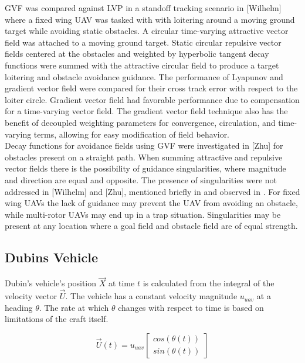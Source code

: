 \documentclass[conf]{new-aiaa}
\begin{document}
GVF was compared against LVP in a standoff tracking scenario in [Wilhelm] where a fixed wing UAV was tasked with with loitering around a moving ground target while avoiding static obstacles.  A circular time-varying attractive vector field was attached to a moving ground target. Static circular repulsive vector fields centered at the obstacles and weighted by hyperbolic tangent decay functions were summed with the attractive circular field to produce a target loitering and obstacle avoidance guidance. The performance of Lyapunov \cite{frew_cooperative_2007} and gradient vector field \cite{goncalves_artificial_2009,goncalves_circulation_2010,goncalves_vector_2010} were compared for their cross track error with respect to the loiter circle. Gradient vector field had favorable performance due to compensation for a time-varying vector field. The gradient vector field technique also has the benefit of decoupled weighting parameters for convergence, circulation, and time-varying terms, allowing for easy modification of field behavior. \\

Decay functions for avoidance fields using GVF were investigated in [Zhu] for obstacles present on a straight path. When summing attractive and repulsive vector fields there is the possibility of guidance singularities, where magnitude and direction are equal and opposite. The presence of singularities were not addressed in [Wilhelm] and [Zhu], mentioned briefly in \cite{nelson_cooperative_2005} and observed in \cite{panagou_motion_2014}. For fixed wing UAVs the lack of guidance may prevent the UAV from avoiding an obstacle, while multi-rotor UAVs may end up in a trap situation. Singularities may be present at any location where a goal field and obstacle field are of equal strength. \\


\subsection{Dubins Vehicle}
Dubin's vehicle's position $\overrightarrow{X}$ at time $t$ is calculated from the integral of the velocity vector $\overrightarrow{U}$. The vehicle has a constant velocity magnitude $u_{uav}$ at a heading $\theta$. The rate at which $\theta$ changes with respect to time is based on limitations of the craft itself. 

\begin{equation}
\label{uavVelocity}
\overrightarrow{U}(t) = u_{uav} \begin{bmatrix}
cos(\theta(t)) \\
sin(\theta(t))
\end{bmatrix}
\end{equation}
\end{document}
